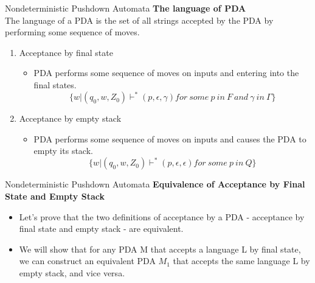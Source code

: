 \documentclass{beamer}
\begin{document}
\begin{frame}{Nondeterministic Pushdown Automata}
	\textbf{The language of PDA}\\
	The language of a PDA is the set of all strings accepted by the PDA by
	performing some sequence of moves.\\
\begin{enumerate}
	\item Acceptance by final state
	\begin{itemize}
		\item PDA performs some sequence of moves on inputs and entering into the final states.
		$$\{w\big|(q_0,w,Z_0)\vdash^*(p,\epsilon,\gamma) for\ some\  p\  in\  F\  and\  \gamma \ in \ \Gamma\}$$
	\end{itemize}
\item Acceptance by empty stack
\begin{itemize}
	\item PDA performs some sequence of moves on inputs and causes the PDA to empty its
	stack.
		$$\{w\big|(q_0,w,Z_0)\vdash^*(p,\epsilon,\epsilon) for\ some\  p\  in\  Q\}$$
\end{itemize}
\end{enumerate}
\end{frame}

\begin{frame}{Nondeterministic Pushdown Automata}
	\textbf{ Equivalence of Acceptance by Final State and Empty Stack}\\
	\begin{itemize}
		\item Let's prove that the two definitions of acceptance by a PDA - acceptance by final state and empty stack - are equivalent. 
		\item We will show that for any PDA M that accepts a language L by final state, we can construct an equivalent PDA $M_1$ that accepts the same language L by empty stack, and vice versa.
	\end{itemize}

\end{frame}
\end{document}
